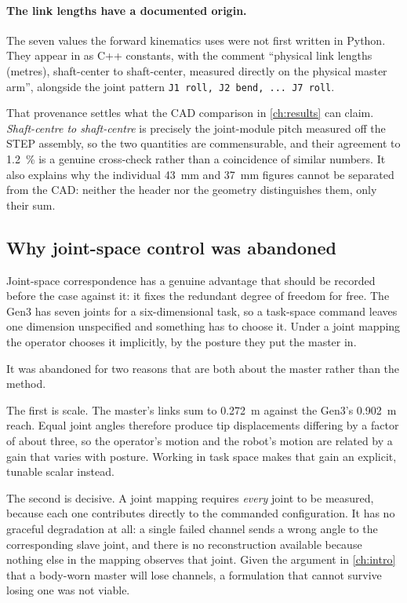 \paragraph{The link lengths have a documented origin.} The seven values the
forward kinematics uses were not first written in Python. They appear in
 as C++ constants, with the comment
``physical link lengths (metres), shaft-center to shaft-center, measured
directly on the physical master arm'', alongside the joint pattern
\verb|J1 roll, J2 bend, ... J7 roll|.

That provenance settles what the CAD comparison in \cref{ch:results} can
claim. \emph{Shaft-centre to shaft-centre} is precisely the joint-module pitch
measured off the STEP assembly, so the two quantities are commensurable, and
their agreement to \SI{1.2}{\percent} is a genuine cross-check rather than a
coincidence of similar numbers. It also explains why the individual
\SI{43}{\milli\metre} and \SI{37}{\milli\metre} figures cannot be separated
from the CAD: neither the header nor the geometry distinguishes them, only
their sum.

\subsection{Why joint-space control was abandoned}

Joint-space correspondence has a genuine advantage that should be recorded
before the case against it: it fixes the redundant degree of freedom for free.
The Gen3 has seven joints for a six-dimensional task, so a task-space command
leaves one dimension unspecified and something has to choose it. Under a joint
mapping the operator chooses it implicitly, by the posture they put the master
in.

It was abandoned for two reasons that are both about the master rather than
the method.

The first is scale. The master's links sum to \SI{0.272}{\metre} against the
Gen3's \SI{0.902}{\metre} reach. Equal joint angles therefore produce tip
displacements differing by a factor of about three, so the operator's motion
and the robot's motion are related by a gain that varies with posture. Working
in task space makes that gain an explicit, tunable scalar instead.

The second is decisive. A joint mapping requires \emph{every} joint to be
measured, because each one contributes directly to the commanded
configuration. It has no graceful degradation at all: a single failed channel
sends a wrong angle to the corresponding slave joint, and there is no
reconstruction available because nothing else in the mapping observes that
joint. Given the argument in \cref{ch:intro} that a body-worn master will lose
channels, a formulation that cannot survive losing one was not viable.

